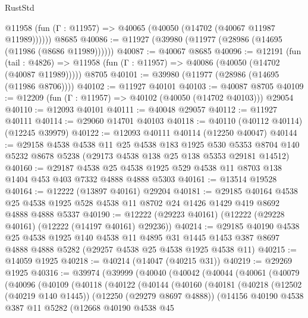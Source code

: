 \begin{lexlean}{RustStd}
\begin{coremodule}
      @11958 (fun (Γ : @11957) => @40065 (@40050 (@14702 (@40067 @11987 @11989))))))
    @8685
@40086 := @11927 (@39980 (@11977 (@28986 (@14695 (@11986 (@8686 @11989))))))
@40087 := @40067 @8685
@40096 := @12191
    (fun (tail : @4826) => @11958 (fun (Γ : @11957) => @40086 (@40050 (@14702 (@40087 @11989)))))
    @8705
@40101 := @39980 (@11977 (@28986 (@14695 (@11986 @8706))))
@40102 := @11927 @40101
@40103 := @40087 @8705
@40109 := @12209 (fun (Γ : @11957) => @40102 (@40050 (@14702 @40103))) @29054
@40110 := @12093 @40101
@40111 := @40048 @29057
@40112 := @11927 @40111
@40114 := @29060 @14701 @40103
@40118 := @40110 (@40112 @40114) (@12245 @39979)
@40122 := @12093 @40111 @40114 (@12250 @40047)
@40144 := @29158
    @4538
    @4538
    @11
    @25
    @4538
    @183
    @1925
    @530
    @5353
    @8704
    @140
    @5232
    @8678
    @5238
    (@29173 @4538 @138 @25 @138 @5353 @29181 @14512)
@40160 := @29187
    @4538
    @25
    @4538
    @1925
    @529
    @4538
    @11
    @8703
    @138
    @1404
    @453
    @403
    @7332
    @4888
    @4888
    @5303
@40161 := @13514 @19528
@40164 := @12222 (@13897 @40161) @29204
@40181 := @29185
    @40164
    @4538
    @25
    @4538
    @1925
    @528
    @4538
    @11
    @8702
    @24
    @1426
    @1429
    @419
    @8692
    @4888
    @4888
    @5337
@40190 := @12222 (@29223 @40161) (@12222 (@29228 @40161) (@12222 (@14197 @40161) @29236))
@40214 := @29185
    @40190
    @4538
    @25
    @4538
    @1925
    @140
    @4538
    @11
    @4895
    @31
    @1445
    @1453
    @387
    @8697
    @4888
    @4888
    @5282
    (@29257 @4538 @25 @4538 @1925 @4538 @11)
@40215 := @14059 @1925
@40218 := @40214 (@14047 (@40215 @31))
@40219 := @29269 @1925
@40316 := @39974
    (@39999
      (@40040
        (@40042
          (@40044
            (@40061
              (@40079
                (@40096
                  (@40109
                    (@40118
                      (@40122
                        (@40144
                          (@40160
                            (@40181
                              (@40218
                                (@12502 (@40219 @140 @1445))
                                (@12250 (@29279 @8697 @4888))
                                (@14156
                                  @40190
                                  @4538
                                  @387
                                  @11
                                  @5282
                                  (@12668
                                    @40190
                                    @4538
                                    @45

\end{coremodule}
\end{lexlean}
